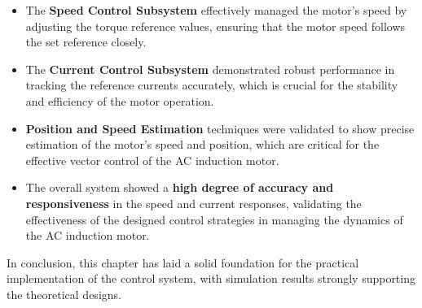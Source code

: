 \begin{itemize}
    \item The \textbf{Speed Control Subsystem} effectively managed the motor's speed by adjusting the torque reference values, ensuring that the motor speed follows the set reference closely.
    \item The \textbf{Current Control Subsystem} demonstrated robust performance in tracking the reference currents accurately, which is crucial for the stability and efficiency of the motor operation.
    \item \textbf{Position and Speed Estimation} techniques were validated to show precise estimation of the motor's speed and position, which are critical for the effective vector control of the AC induction motor.
    \item The overall system showed a \textbf{high degree of accuracy and responsiveness} in the speed and current responses, validating the effectiveness of the designed control strategies in managing the dynamics of the AC induction motor.
\end{itemize}

In conclusion, this chapter has laid a solid foundation for the practical implementation of the control system, with simulation results strongly supporting the theoretical designs.


\newpage